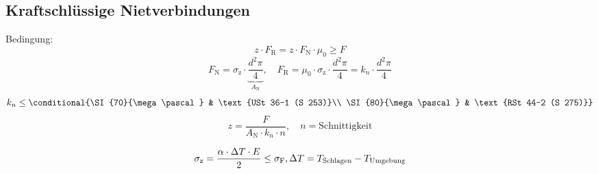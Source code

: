 	\subsection{Kraftschlüssige Nietverbindungen} %
		Bedingung:
		\begin{equation*}
			z\cdot F_{\text{R}} = z \cdot F_{\text{N}} \cdot \mu_0 \geq F
		\end{equation*}
		\begin{equation*}
			F_{\text{N}} = \sigma_{\text{z}}\cdot \underbrace{\frac{d^2\pi}{4}}_{A_{\text{N}}}, \quad F_{\text{R}}= \mu_0 \cdot  \sigma_{\text{z}} \cdot \frac{d^2\pi}{4} = k_n \cdot \frac{d^2\pi}{4}
		\end{equation*}
		\begin{equation*}
			k_n \leq \conditional{\SI{70}{\mega\pascal} & \text{USt 36-1 (S 253)}\\
				\SI{80}{\mega\pascal} & \text{RSt 44-2 (S 275)}}
		\end{equation*}
		\begin{equation*}
			z = \frac{F}{A_{\text{N}}\cdot k_n \cdot n}, \quad n = \text{Schnittigkeit}
		\end{equation*}
		
		\begin{equation*}
			\sigma_{\text{z}} = \frac{\alpha \cdot \Delta T \cdot E}{2} \leq \sigma_{\text{F}}, \hfill \Delta T = T_{\text{Schlagen}}-T_{\text{Umgebung}}
		\end{equation*}
